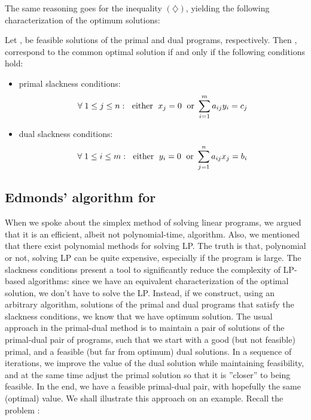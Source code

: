 \noindent
The same reasoning goes for the inequality  $(\diamondsuit)$, yielding the following characterization
of the optimum solutions:

\begin{framed}
\begin{veta}
  \label{thm:slackness}
Let ,  be feasible solutions of the primal and dual programs, respectively.
Then ,  correspond to the common optimal solution if and only if the following 
conditions hold:

\begin{itemize}
\item primal slackness conditions:
$$\forall\;1\le j\le n:\;{\rm\ either\ }\; x_j=0\; {\rm\ or\ }\sum_{i=1}^ma_{ij}y_i=c_j$$
\item dual slackness conditions:
$$\forall\;1\le i\le m:\;{\rm\ either\ }\; y_i=0\; {\rm\ or\ }\sum_{j=1}^na_{ij}x_j=b_i$$
\end{itemize}
\end{veta}
\end{framed}

\subsection*{Edmonds' algorithm for \minfactor}

\noindent
When we spoke about the simplex method of solving linear programs, we argued that it is an efficient, albeit 
not polynomial-time, algorithm. Also, we mentioned that there exist polynomial methods for solving LP. The
truth is that, polynomial or not, solving LP can be quite expensive, especially if the program is large. 
The slackness conditions present a tool to significantly reduce the complexity of LP-based algorithms:
since we have an equivalent characterization of the optimal solution, we don't have to solve the LP. 
Instead, if we construct, using an arbitrary algorithm, solutions of the primal and dual programs that
satisfy the slackness conditions, we know that we have optimum solution. The usual approach in the
primal-dual method is to maintain a pair of solutions of the primal-dual pair of programs, such that
we start with a good (but not feasible) primal, and a feasible (but far from optimum) dual solutions.
In a sequence of iterations, we improve the value of the dual solution while maintaining feasibility, 
and at the same time adjust the primal
solution so that it is ''closer'' to being feasible.  In the end, we have a feasible primal-dual pair, 
with hopefully the same (optimal) value. We shall illustrate this approach on an example.
Recall the problem \maxWBmatching:

